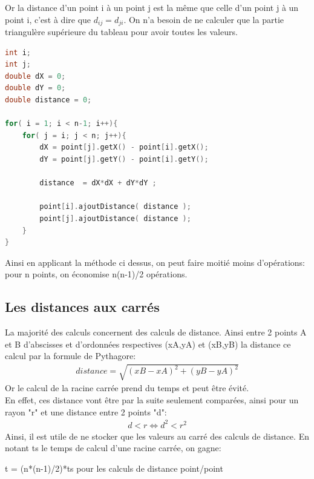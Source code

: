\documentclass[stage2a]{tnreport}
\begin{document}
Or la distance d'un point i à un point j est la même que celle d'un point j à un point i, c'est à dire que \begin{math} d_{ij} = d_{ji}\end{math}. On n'a besoin de ne calculer que la partie triangulère supérieure du tableau pour avoir toutes les valeurs.\\

\begin{lstlisting}[language=C++, caption={Remplissage des listes de distance}, label={lst:distances}]
int i;
int j;
double dX = 0;
double dY = 0;
double distance = 0;

for( i = 1; i < n-1; i++){
    for( j = i; j < n; j++){
        dX = point[j].getX() - point[i].getX();
		dY = point[j].getY() - point[i].getY();

 		distance  = dX*dX + dY*dY ;
 		
 		point[i].ajoutDistance( distance );
        point[j].ajoutDistance( distance );
    }
}
\end{lstlisting}

Ainsi en applicant la méthode ci dessus, on peut faire moitié moins d'opérations: pour n points, on économise n(n-1)/2 opérations.

\subsection{Les distances aux carrés}

La majorité des calculs concernent des calculs de distance. Ainsi entre 2 points A et B d'abscisses et d'ordonnées respectives (xA,yA) et (xB,yB) la distance ce calcul par la formule de Pythagore:
\begin{align*}
distance = \sqrt{(xB-xA)^2 + (yB-yA)^2}
\end{align*}
Or le calcul de la racine carrée prend du temps et peut être évité.\\

En effet, ces distance vont être par la suite seulement comparées, ainsi pour un rayon "r" et une distance entre 2 points "d":
\begin{align*}
d < r  \Leftrightarrow  d^2 < r^2
\end{align*}
Ainsi, il est utile de ne stocker que les valeurs au carré des calculs de distance. En notant ts le temps de calcul d'une racine carrée, on gagne:

\hspace*{1cm} t = (n*(n-1)/2)*ts \hspace*{1cm} pour les calculs de distance point/point
\end{document}

